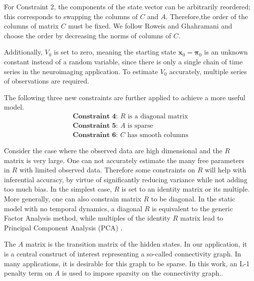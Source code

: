 \documentclass[fleqn]{article}
\begin{document}
For Constraint 2, the components of the state vector can be arbitrarily reordered; this corresponds to swapping the columns of $C$ and $A$. Therefore,the order of the columns of matrix $C$ must be fixed. We follow Roweis and Ghahramani and choose the order by decreasing the norms of columns of $C$.

Additionally, $V_0$ is set to zero, meaning the starting state $\mathbf{x}_0=\mathbf{\pi}_0$ is an unknown constant instead of a random variable, since there is only a single chain of time series in the neuroimaging application. To estimate $V_0$ accurately, multiple series of observations are required.

The following three new constraints are further applied to achieve a more useful model.
\vspace*{-3mm}
\begin{equation*}\label{eqn:constraints2}
\begin{aligned}
&\textbf{Constraint 4: }R\text{ is a diagonal matrix}\\
&\textbf{Constraint 5: }A\text{ is sparse}\\
&\textbf{Constraint 6: }C\text{ has smooth columns}
\end{aligned}
\end{equation*}

Consider the case where the observed data are high dimensional and the $R$ matrix is very large. One can not accurately estimate the many free parameters in $R$ with limited observed data. Therefore some constraints on $R$ will help with inferential accuracy, by virtue of significantly reducing variance while not adding too much bias. In the simplest case, $R$ is set to an identity matrix or its multiple. More generally, one can also constrain matrix $R$ to be diagonal. In the static model with no temporal dynamics, a diagonal $R$ is equivalent to the generic Factor Analysis method, while multiples of the identity $R$ matrix lead to Principal Component Analysis (PCA) \cite{roweis1999unifying}.

The $A$ matrix is the transition matrix of the hidden states. In our application, it is a central construct of interest representing a so-called connectivity graph. In many applications, it is desirable for this graph to be sparse. In this work, an L-1 penalty term on $A$ is used to impose sparsity on the connectivity graph..
\end{document}
